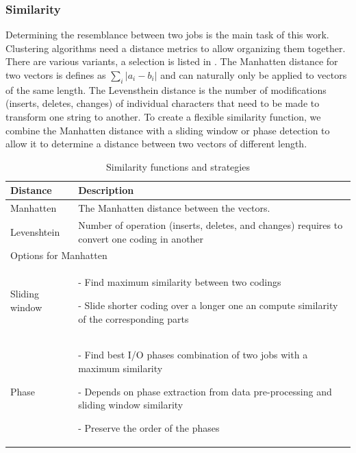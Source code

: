 \documentclass[]{llncs}
\begin{document}
\subsubsection{Similarity}
Determining the resemblance between two jobs is the main task of this work.
Clustering algorithms need a distance metrics to allow organizing them together.
There are various variants, a selection is listed in .
The Manhatten distance for two vectors is defines as $\sum_i |a_i - b_i|$ and can naturally only be applied to vectors of the same length.
The Levensthein distance is the number of modifications (inserts, deletes, changes) of individual characters that need to be made to transform one string to another.
To create a flexible similarity function, we combine the Manhatten distance with a sliding window or phase detection to allow it to determine a distance between two vectors of different length.

\begin{table}
  \centering
  \begin{tabularx}{\textwidth}{lX}
    Distance & Description \\
    \hline
    Manhatten & The Manhatten distance between the vectors. \\
    \hline
    Levenshtein &  Number of operation (inserts, deletes, and changes) requires to convert one coding in another \\
    \hline
    \hline
    \multicolumn{2}{l}{Options for Manhatten} \\
    \hline
    Sliding window &  - Find maximum similarity between two codings \par
            - Slide shorter coding over a longer one an compute similarity of the corresponding parts \\
    \hline
    Phase &  - Find best I/O phases combination of two jobs with a maximum similarity \par - Depends on phase extraction from data pre-processing and sliding window similarity \par - Preserve the order of the phases \\
    \hline
  \end{tabularx}
  \caption{Similarity functions and strategies}
  \label{tab:sim_funcs}
\end{table}
\end{document}

